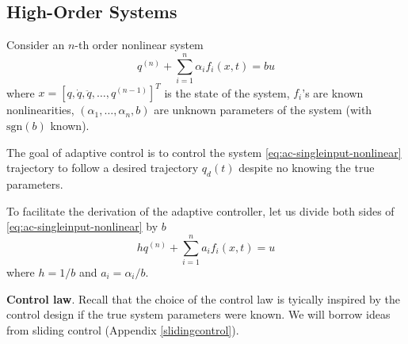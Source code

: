 \documentclass[
]{book}
\theoremstyle{definition}
\theoremstyle{definition}
\theoremstyle{definition}
\theoremstyle{definition}
\theoremstyle{remark}
\begin{document}
\hypertarget{high-order-systems}{%
\subsection{High-Order Systems}\label{high-order-systems}}

Consider an \(n\)-th order nonlinear system
\begin{equation}
q^{(n)} + \sum_{i=1}^n \alpha_i f_i(x,t) = bu
\label{eq:ac-singleinput-nonlinear}
\end{equation}
where \(x=[q,\dot{q},\ddot{q},\dots,q^{(n-1)}]^T\) is the state of the system, \(f_i\)'s are known nonlinearities, \((\alpha_1,\dots,\alpha_n,b)\) are unknown parameters of the system (with \(\mathrm{sgn}(b)\) known).

The goal of adaptive control is to control the system \eqref{eq:ac-singleinput-nonlinear} trajectory to follow a desired trajectory \(q_d(t)\) despite no knowing the true parameters.

To facilitate the derivation of the adaptive controller, let us divide both sides of \eqref{eq:ac-singleinput-nonlinear} by \(b\)
\begin{equation}
h q^{(n)} + \sum_{i=1}^n a_i f_i(x,t) = u
\label{eq:ac-singleinput-nonlinear-equivalent}
\end{equation}
where \(h = 1 / b\) and \(a_i = \alpha_i / b\).

\textbf{Control law}. Recall that the choice of the control law is tyically inspired by the control design if the true system parameters were known. We will borrow ideas from sliding control (Appendix \ref{slidingcontrol}).
\end{document}
